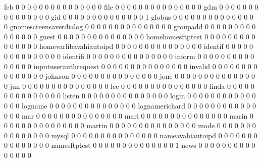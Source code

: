 \documentclass[compress,8pt]{beamer}
\begin{document}
\begin{frame}
\begin{Schunk}
  feb                                      0 0 0 0 0 0 0 0 0  0  0  0  0  0  0
  file                                     0 0 0 0 0 0 0 0 0  0  0  0  0  0  0
  gdm                                      0 0 0 0 0 0 0 0 0  0  0  0  0  0  0
  gid                                      0 0 0 0 0 0 0 0 0  0  0  0  0  0  1
  globus                                   0 0 0 0 0 0 0 0 0  0  0  0  0  0  0
  gnomescreensaverdialog                   0 0 0 0 0 0 0 0 0  0  0  0  0  0  0
  groupadd                                 0 0 0 0 0 0 0 0 0  0  0  0  0  0  0
  guest                                    0 0 0 0 0 0 0 0 0  0  0  0  0  0  0
  homehomesftptest                         0 0 0 0 0 0 0 0 0  0  0  0  0  0  0
  homevarlibavahiautoipd                   0 0 0 0 0 0 0 0 0  0  0  0  0  0  0
  identif                                  0 0 0 0 0 0 0 0 0  0  0  0  0  0  0
  identifi                                 0 0 0 0 0 0 0 0 0  0  0  0  0  0  0
  inform                                   0 0 0 0 0 0 0 0 0  0  0  0  0  0  0
  inputuserauthrequest                     0 0 0 0 0 0 0 0 0  0  0  0  0  0  0
  invalid                                  0 0 0 0 0 0 0 0 0  0  0  0  0  0  0
  johnson                                  0 0 0 0 0 0 0 0 0  0  0  0  0  0  0
  jone                                     0 0 0 0 0 0 0 0 0  0  0  0  0  0  0
  jun                                      0 0 0 0 0 0 0 0 0  0  0  0  0  0  0
  lee                                      0 0 0 0 0 0 0 0 0  0  0  0  0  0  0
  linda                                    0 0 0 0 0 0 0 0 0  0  0  0  0  0  0
  listen                                   0 0 0 0 0 0 0 0 0  0  0  0  0  0  0
  login                                    0 0 0 0 0 0 0 0 0  0  0  0  0  0  0
  logname                                  0 0 0 0 0 0 0 0 0  0  0  0  0  0  0
  lognamerichard                           0 0 0 0 0 0 0 0 0  0  0  0  0  0  0
  mar                                      0 0 0 0 0 0 0 0 0  0  0  0  0  0  0
  mari                                     0 0 0 0 0 0 0 0 0  0  0  0  0  0  0
  marin                                    0 0 0 0 0 0 0 0 0  0  0  0  0  0  0
  martin                                   0 0 0 0 0 0 0 0 0  0  0  0  0  0  0
  mode                                     0 0 0 0 0 0 0 0 0  0  0  0  0  0  0
  mysql                                    0 0 0 0 0 0 0 0 0  0  0  0  0  0  0
  nameavahiautoipd                         0 0 0 0 0 0 0 0 0  0  0  0  0  0  0
  namesftptest                             0 0 0 0 0 0 0 0 0  0  0  0  0  0  1
  news                                     0 0 0 0 0 0 0 0 0  0  0  0  0  0  0

\end{Schunk}
\end{frame}
\end{document}
